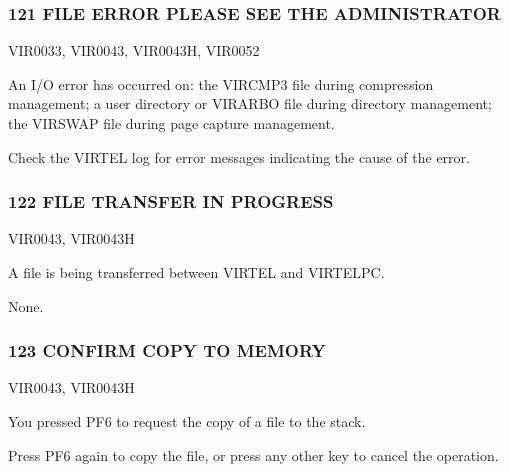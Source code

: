 \documentclass[letterpaper,10pt,english]{sphinxmanual}
\begin{document}
\subsubsection{121 FILE ERROR PLEASE SEE THE ADMINISTRATOR}
\label{\detokenize{messages:file-error-please-see-the-administrator}}\begin{description}
\sphinxAtStartPar
VIR0033, VIR0043, VIR0043H, VIR0052

\sphinxAtStartPar
An I/O error has occurred on:
\sphinxhyphen{} the VIRCMP3 file during compression management;
\sphinxhyphen{} a user directory or VIRARBO file during directory management;
\sphinxhyphen{} the VIRSWAP file during page capture management.

\sphinxAtStartPar
Check the VIRTEL log for error messages indicating the cause of the error.

\end{description}


\subsubsection{122 FILE TRANSFER IN PROGRESS}
\label{\detokenize{messages:file-transfer-in-progress}}\begin{description}
\sphinxAtStartPar
VIR0043, VIR0043H

\sphinxAtStartPar
A file is being transferred between VIRTEL and VIRTELPC.

\sphinxAtStartPar
None.

\end{description}


\subsubsection{123 CONFIRM COPY TO MEMORY}
\label{\detokenize{messages:confirm-copy-to-memory}}\begin{description}
\sphinxAtStartPar
VIR0043, VIR0043H

\sphinxAtStartPar
You pressed PF6 to request the copy of a file to the stack.

\sphinxAtStartPar
Press PF6 again to copy the file, or press any other key to cancel the operation.

\end{description}
\end{document}
